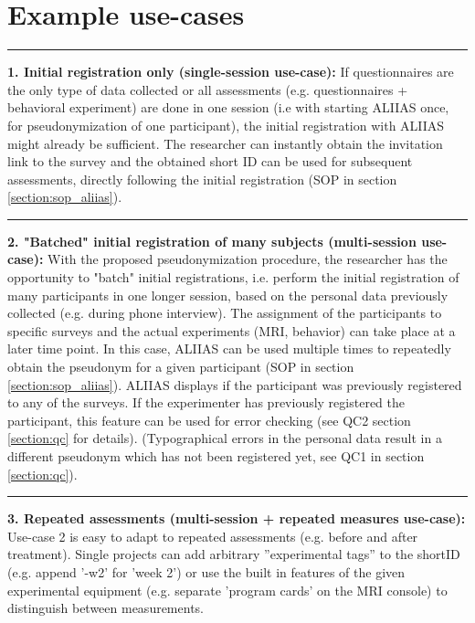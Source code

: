 \section{Example use-cases}
\label{use-case:one-session}
\par\noindent\rule{\textwidth\color{pniblue}}{0.4pt}
\textbf{1. Initial registration only (single-session use-case):}
If questionnaires are the only type of data collected or all assessments (e.g. questionnaires + behavioral experiment) are done in one session (i.e with starting ALIIAS once, for pseudonymization of one participant), the initial registration with ALIIAS might already be sufficient. The researcher can instantly obtain the invitation link to the survey and the obtained short ID can be used for subsequent assessments, directly following the initial registration (SOP in section \ref{section:sop_aliias}).

\par\noindent\rule{\textwidth\color{pniblue}}{0.4pt}
\textbf{2. "Batched" initial registration of many subjects (multi-session use-case):}
With the proposed pseudonymization procedure, the researcher has the opportunity to "batch" initial registrations, i.e. perform the initial registration of many participants in one longer session, based on the personal data previously collected (e.g. during phone interview). The assignment of the participants to specific surveys and the actual experiments (MRI, behavior) can take place at a later time point. In this case, ALIIAS can be used multiple times to repeatedly obtain the pseudonym for a given participant (SOP in section \ref{section:sop_aliias}). ALIIAS displays if the participant was previously registered to any of the surveys. If the experimenter has previously registered the participant, this feature can be used for error checking (see QC2 section \ref{section:qc} for details). (Typographical errors in the personal data result in a different pseudonym which has not been registered yet, see QC1 in section \ref{section:qc}).

\par\noindent\rule{\textwidth\color{pniblue}}{0.4pt}
\textbf{3. Repeated assessments (multi-session + repeated measures use-case):}
Use-case 2 is easy to adapt to repeated assessments (e.g. before and after treatment). Single projects can add arbitrary ”experimental tags” to the shortID (e.g. append ’-w2’ for 'week 2') or use the built in features of the given experimental equipment (e.g. separate ’program cards’ on the MRI console) to distinguish between measurements. 

